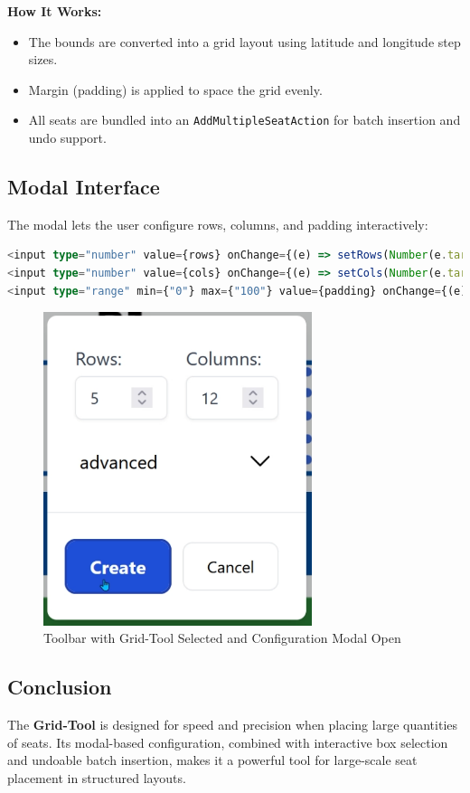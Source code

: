 \textbf{How It Works:}
\begin{itemize}
    \item The bounds are converted into a grid layout using latitude and longitude step sizes.
    \item Margin (padding) is applied to space the grid evenly.
    \item All seats are bundled into an \texttt{AddMultipleSeatAction} for batch insertion and undo support.
\end{itemize}

\subsection{Modal Interface}
The modal lets the user configure rows, columns, and padding interactively:

\begin{lstlisting}[language=TypeScript, caption=Modal Input Fields, label=lst:grid-modal-ui]
<input type="number" value={rows} onChange={(e) => setRows(Number(e.target.value))} />
<input type="number" value={cols} onChange={(e) => setCols(Number(e.target.value))} />
<input type="range" min={"0"} max={"100"} value={padding} onChange={(e) => setPadding(Number(e.target.value))} />
\end{lstlisting}

\begin{figure}[H]
    \centering
    \includegraphics[width=0.7\textwidth]{pics/grid-tool.png}
    \caption{Toolbar with Grid-Tool Selected and Configuration Modal Open}
    \label{fig:grid-tool-toolbar}
\end{figure}

\subsection{Conclusion}
The \textbf{Grid-Tool} is designed for speed and precision when placing large quantities of seats. Its modal-based configuration, combined with interactive box selection and undoable batch insertion, makes it a powerful tool for large-scale seat placement in structured layouts.
